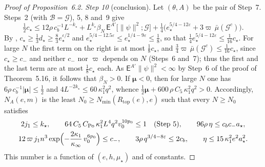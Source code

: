 \documentclass[11pt,letterpaper,reqno]{amsart}
\theoremstyle{definition}
\begin{document}
\begin{proof}[Proof of Proposition~6.2]
\emph{Step 10} (conclusion).
Let $(\theta,A)$ be the pair of Step~7.
Steps~2 (with $\mathcal B=\mathcal G$), 5, 8 and~9 give
\begin{equation*}
\tfrac12c_\star\le12\rho\,c_b^{-1}L^{-k_\star}+L^{k_\star}\beta_N\,\mathsf E^{A'}\bigl[\|\psi\|^2;\mathcal G\bigr]+\tfrac14\bigl(e_\star^{5/4-12\varepsilon}+3\varpi\,\bar\mu(\mathcal G^c)\bigr).
\end{equation*}
By \cite[(T2)]{QEDIII}, $c_\star\ge\frac13d_\star\ge\frac83e_\star^{\varepsilon/2}$ and $e_\star^{5/4-12.5\varepsilon}\le e_\star^{1/4-9\varepsilon}\le\frac18$, so that $\frac14e_\star^{5/4-12\varepsilon}\le\frac1{16}c_\star$.
For large $N$ the first term on the right is at most $\frac18c_\star$, and $\frac34\varpi\,\bar\mu(\mathcal G^c)\le\frac1{16}c_\star$, since $c_\star\ge c_-$ and neither $c_-$ nor $\varpi$ depends on $N$ (Steps~6 and~7);
thus the first and the last term are at most $\frac18c_\star$ each.
As $\mathsf E^{A'}\|\psi\|^2<\infty$ by Step~6 of the proof of Theorem~5.16, it follows that $\beta_N>0$.
If $\boldsymbol\mu<0$, then for large $N$ one has $6\rho\,c_b^{-1}|\boldsymbol\mu|\le\frac12$ \cite[Proposition~28.3\,(d)]{QEDIII} and $4L^{-2k_\star}\le60\,\kappa_1^2q^2$, whence $\frac12\boldsymbol\mu+600\,\rho\,C_5\,\kappa_1^2q^2>0$.
Accordingly, $N_A(e,m)$ is the least $N_0\ge N_{\min}(R_{\mathrm{top}}(e),e)$ such that every $N\ge N_0$ satisfies
\begin{gather*}
2j_1\le k_\star,\qquad64\,C_5\,C_{\mathrm{Po}}\,\kappa_1^2L^4q^2v_0^{10p_0}\le1\quad\text{(Step~5)},\qquad96\rho\,\eta\le c_bc_-a_\star,\\
12\,\varpi\,j_1n^3\exp\Bigl(-\frac{2\kappa_1}{\kappa_\infty}\,v_0^{6p_0}\Bigr)\le c_-,\qquad3\rho\,q^{3/4-8\varepsilon}\le2c_b,\qquad\eta\le15\,\kappa_1^2e^2a_\star^2 .
\end{gather*}
This number is a function of $(e,h,\mu_\star)$ and of constants.
\end{proof}
\end{document}
